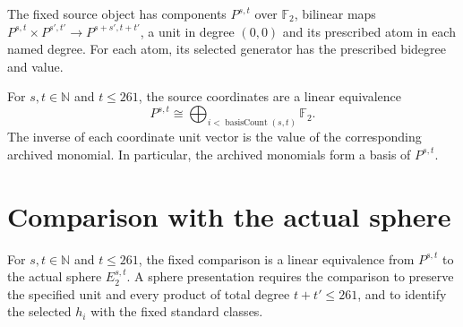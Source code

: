 \begin{definition}
\label{sem:Computation:source-components}
The fixed source object has components $P^{s,t}$ over $\mathbb F_2$, bilinear maps $P^{s,t}\times P^{s\prime,t\prime}\to P^{s+s\prime,t+t\prime}$, a unit in degree $(0,0)$ and its prescribed atom in each named degree. For each atom, its selected generator has the prescribed bidegree and value.
\end{definition}

\begin{definition}
\label{sem:Computation:source-basis}
For $s,t\in\mathbb N$ and $t\leq261$, the source coordinates are a linear equivalence
\[P^{s,t}\cong\bigoplus_{i<\operatorname{basisCount}(s,t)}\mathbb F_2.\]
The inverse of each coordinate unit vector is the value of the corresponding archived monomial. In particular, the archived monomials form a basis of $P^{s,t}$.
\end{definition}

\section{Comparison with the actual sphere}

\begin{definition}
\label{sem:Computation:bounded-comparison}
For $s,t\in\mathbb N$ and $t\leq261$, the fixed comparison is a linear equivalence from $P^{s,t}$ to the actual sphere $E_2^{s,t}$. A sphere presentation requires the comparison to preserve the specified unit and every product of total degree $t+t\prime\leq261$, and to identify the selected $h_i$ with the fixed standard classes.
\end{definition}


